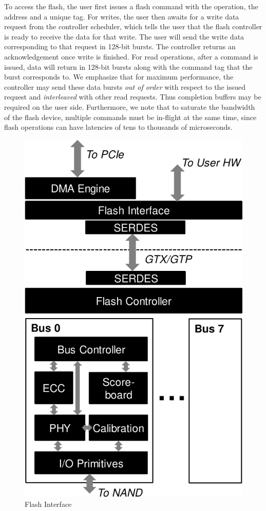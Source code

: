 To access the flash, the user first issues a flash command
with the operation, the address and a unique tag.
For writes, the user then awaits for a write data request from
the controller scheduler, which tells the user that the flash controller is
ready to receive the data for that write. The user will send the write data
corresponding to that request in 128-bit bursts. The controller returns an
acknowledgement once write is finished. 
For read operations, after a command is issued,
data will return in 128-bit bursts along with the command tag that the
burst corresponds to. We emphasize that for maximum performance, the
controller may send these data bursts \emph{out of order} with respect to
the issued request and \emph{interleaved} with other read requests.
Thus completion buffers may be required on the user side. Furthermore,
we note that to saturate the bandwidth of the flash device, multiple
commands must be in-flight at the same time, since flash operations
can have latencies of tens to thousands of microseconds. 

\begin{figure}[h]
	\begin{center}
	\includegraphics[scale=0.4]{figures/top-arch-crop.pdf}
	\caption{Flash Interface}
	\label{fig:flashinterface}
	\end{center}
\end{figure}

